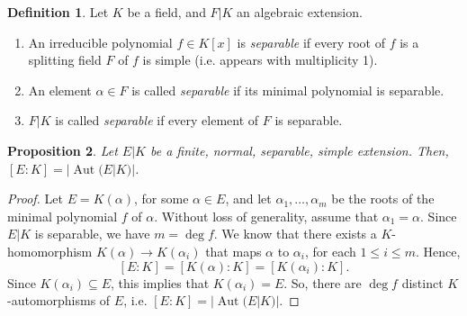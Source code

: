 \documentclass[a4paper, openany]{memoir}
\theoremstyle{definition}
\newtheorem{definition}{Definition}[section]
\theoremstyle{plain}
\newtheorem{proposition}[definition]{Proposition}
\begin{document}
    \begin{definition}
        Let $K$ be a field, and $F|K$ an algebraic extension.
        \begin{enumerate}
            \item An irreducible polynomial $f \in K[x]$ is \emph{separable} if every root of $f$ is a splitting field $F$ of $f$ is simple (i.e. appears with multiplicity 1).
            \item An element $\alpha \in F$ is called \emph{separable} if its minimal polynomial is separable.
            \item $F|K$ is called \emph{separable} if every element of $F$ is separable.
        \end{enumerate}
    \end{definition}

    \begin{proposition}
        Let $E|K$ be a finite, normal, separable, simple extension. Then, $[E : K] = |\operatorname{Aut}(E|K)|$.
    \end{proposition}
    \begin{proof}
        Let $E = K(\alpha)$, for some $\alpha \in E$, and let $\alpha_1, \dots, \alpha_m$ be the roots of the minimal polynomial $f$ of $\alpha$. Without loss of generality, assume that $\alpha_1 = \alpha$. Since $E|K$ is separable, we have $m = \deg f$. We know that there exists a $K$-homomorphism $K(\alpha) \to K(\alpha_i)$ that maps $\alpha$ to $\alpha_i$, for each $1 \leq i \leq m$. Hence,
        \[[E : K] = [K(\alpha) : K] = [K(\alpha_i) : K].\]
        Since $K(\alpha_i) \subseteq E$, this implies that $K(\alpha_i) = E$. So, there are $\deg f$ distinct $K$-automorphisms of $E$, i.e. $[E : K] = |\operatorname{Aut}(E|K)|$.
    \end{proof}
\end{document}
